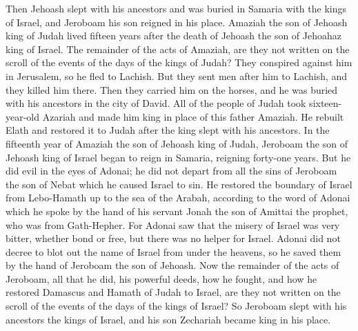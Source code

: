 \begin{biblechapter}
\verse Then Jehoash slept with his ancestors and was buried in Samaria with the kings of Israel, and Jeroboam his son reigned in his place.
 Amaziah the son of Jehoash king of Judah lived fifteen years after the death of Jehoash the son of Jehoahaz king of Israel.
\verse The remainder of the acts of Amaziah, are they not written on the scroll of the events of the days of the kings of Judah?
\verse They conspired against him in Jerusalem, so he fled to Lachish. But they sent men after him to Lachish, and they killed him there.
\verse Then they carried him on the horses, and he was buried with his ancestors in the city of David.
\verse All of the people of Judah took sixteen-year-old Azariah and made him king in place of this father Amaziah.
\verse He rebuilt Elath and restored it to Judah after the king slept with his ancestors.
\verse In the fifteenth year of Amaziah the son of Jehoash king of Judah, Jeroboam the son of Jehoash king of Israel began to reign in Samaria, reigning forty-one years.
\verse But he did evil in the eyes of Adonai; he did not depart from all the sins of Jeroboam the son of Nebat which he caused Israel to sin.
\verse He restored the boundary of Israel from Lebo-Hamath up to the sea of the Arabah, according to the word of Adonai which he spoke by the hand of his servant Jonah the son of Amittai the prophet, who was from Gath-Hepher.
\verse For Adonai saw that the misery of Israel was very bitter, whether bond or free, but there was no helper for Israel.
\verse Adonai did not decree to blot out the name of Israel from under the heavens, so he saved them by the hand of Jeroboam the son of Jehoash.
\verse Now the remainder of the acts of Jeroboam, all that he did, his powerful deeds, how he fought, and how he restored Damascus and Hamath of Judah to Israel, are they not written on the scroll of the events of the days of the kings of Israel?
\verse So Jeroboam slept with his ancestors the kings of Israel, and his son Zechariah became king in his place.
\end{biblechapter}


